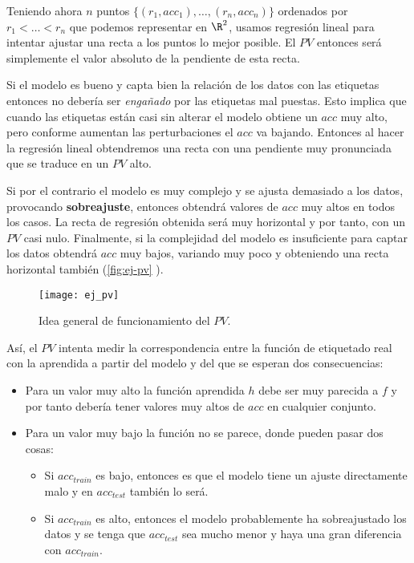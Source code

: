 Teniendo ahora $n$ puntos $\{(r_1, acc_1), \ldots, (r_n, acc_n)\}$ ordenados por $r_1 < \ldots < r_n$ que podemos representar en $\R^2$, usamos regresión lineal para intentar ajustar una recta a los puntos lo mejor posible. El $PV$ entonces será simplemente el valor absoluto de la pendiente de esta recta.

Si el modelo es bueno y capta bien la relación de los datos con las etiquetas entonces no debería ser \emph{engañado} por las etiquetas mal puestas. Esto implica que cuando las etiquetas están casi sin alterar el modelo obtiene un $acc$ muy alto, pero conforme aumentan las perturbaciones el $acc$ va bajando. Entonces al hacer la regresión lineal obtendremos una recta con una pendiente muy pronunciada que se traduce en un $PV$ alto.

Si por el contrario el modelo es muy complejo y se ajusta demasiado a los datos, provocando \textbf{sobreajuste}, entonces obtendrá valores de $acc$ muy altos en todos los casos. La recta de regresión obtenida será muy horizontal y por tanto, con un $PV$ casi nulo. Finalmente, si la complejidad del modelo es insuficiente para captar los datos obtendrá $acc$ muy bajos, variando muy poco y obteniendo una recta horizontal también (\autoref{fig:ej-pv} \cite{zhang2019perturbation}).

\begin{figure}[htpb]
  \centering
  \texttt{[image: ej\_pv]}
  \caption{Idea general de funcionamiento del $PV$.}
  \label{fig:ej-pv}
\end{figure}

Así, el $PV$ intenta medir la correspondencia entre la función de etiquetado real con la aprendida a partir del modelo y del que se esperan dos consecuencias:

\begin{itemize}
  \item Para un valor muy alto la función aprendida $h$ debe ser muy parecida a $f$ y por tanto debería tener valores muy altos de $acc$ en cualquier conjunto.
  \item Para un valor muy bajo la función no se parece, donde pueden pasar dos cosas:
    \begin{itemize}
      \item Si $acc_{train}$ es bajo, entonces es que el modelo tiene un ajuste directamente malo y en $acc_{test}$ también lo será.
      \item Si $acc_{train}$ es alto, entonces el modelo probablemente ha sobreajustado los datos y se tenga que $acc_{test}$ sea mucho menor y haya una gran diferencia con $acc_{train}$.
    \end{itemize}
\end{itemize}

